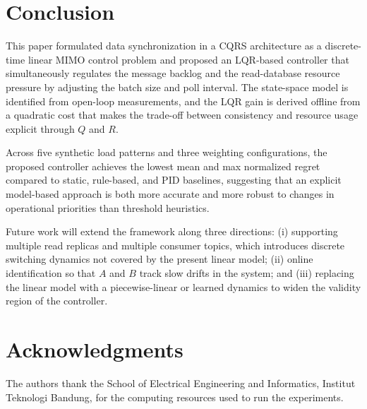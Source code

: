 \section{Conclusion}

This paper formulated data synchronization in a CQRS architecture as a discrete-time linear MIMO control problem and proposed an LQR-based controller that simultaneously regulates the message backlog and the read-database resource pressure by adjusting the batch size and poll interval. The state-space model is identified from open-loop measurements, and the LQR gain is derived offline from a quadratic cost that makes the trade-off between consistency and resource usage explicit through $Q$ and $R$.

Across five synthetic load patterns and three weighting configurations, the proposed controller achieves the lowest mean and max normalized regret compared to static, rule-based, and PID baselines, suggesting that an explicit model-based approach is both more accurate and more robust to changes in operational priorities than threshold heuristics.

Future work will extend the framework along three directions: (i) supporting multiple read replicas and multiple consumer topics, which introduces discrete switching dynamics not covered by the present linear model; (ii) online identification so that $A$ and $B$ track slow drifts in the system; and (iii) replacing the linear model with a piecewise-linear or learned dynamics to widen the validity region of the controller.

\section*{Acknowledgments}

The authors thank the School of Electrical Engineering and Informatics, Institut Teknologi Bandung, for the computing resources used to run the experiments.
